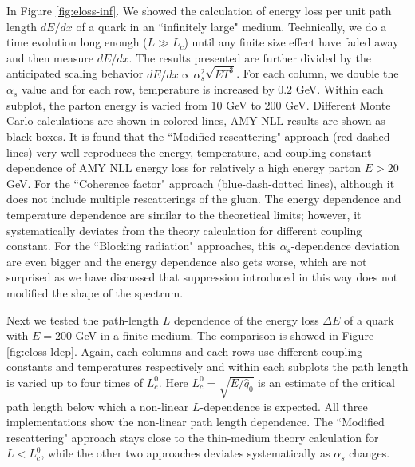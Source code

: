 \documentclass[aps, prc, reprint, amsmath, groupedaddress, nofootinbib]{revtex4-1}
\begin{document}
In Figure \ref{fig:eloss-inf}. We showed the calculation of energy loss per unit path length $dE/dx$ of a quark in an ``infinitely large" medium. 
Technically, we do a time evolution long enough ($L\gg L_c$) until any finite size effect have faded away and then measure $dE/dx$.
The results presented are further divided by the anticipated scaling behavior $dE/dx \propto \alpha_s^2 \sqrt{ET^3}$.
For each column, we double the $\alpha_s$ value and for each row, temperature is increased by $0.2$ GeV. 
Within each subplot, the parton energy is varied from $10$ GeV to $200$ GeV.
Different Monte Carlo calculations are shown in colored lines, AMY NLL results are shown as black boxes. 
It is found that the ``Modified rescattering" approach (red-dashed lines) very well reproduces the energy, temperature, and coupling constant dependence of AMY NLL energy loss for relatively a high energy parton $E>20$ GeV.
For the ``Coherence factor" approach (blue-dash-dotted lines), although it does not include multiple rescatterings of the gluon. The energy dependence and temperature dependence are similar to the theoretical limits; however, it systematically deviates from the theory calculation for different coupling constant.
For the ``Blocking radiation" approaches, this $\alpha_s$-dependence deviation are even bigger and the energy dependence also gets worse, which are not surprised as we have discussed that suppression introduced in this way does not modified the shape of the spectrum.

Next we tested the path-length $L$ dependence of the energy loss $\Delta E$ of a quark with $E = 200$ GeV in a finite medium.
The comparison is showed in Figure \ref{fig:eloss-ldep}.
Again, each columns and each rows use different coupling constants and temperatures respectively and within each subplots the path length is varied up to four times of $L_c^0$.
Here $L_c^0 = \sqrt{E/\hat{q}_0}$ is an estimate of the critical path length below which a non-linear $L$-dependence is expected.
All three implementations show the non-linear path length dependence.
The ``Modified rescattering" approach stays close to the thin-medium theory calculation for $L<L_c^0$, while the other two approaches deviates systematically as $\alpha_s$ changes.
\end{document}
